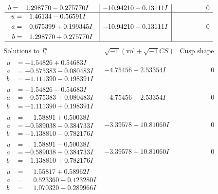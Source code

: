 \documentclass[1p]{elsarticle_modified}
\theoremstyle{definition}
\newcommand{\I}{\sqrt{-1}}
\begin{document}
$$\begin{array}{c|c|c}
\begin{aligned}
b &= \phantom{-}1.298770 - 0.275770 I\end{aligned}
 & -10.94210 + 0.13111 I & \phantom{-0.000000 } 0 \\ \hline\begin{aligned}
u &= \phantom{-}1.46134 - 0.56591 I \\
a &= \phantom{-}0.675399 + 0.199345 I \\
b &= \phantom{-}1.298770 + 0.275770 I\end{aligned}
 & -10.94210 - 0.13111 I & \phantom{-0.000000 } 0\\
 \hline 
 \end{array}$$\newpage$$\begin{array}{c|c|c}  
\text{Solutions to }I^u_{1}& \I (\text{vol} + \sqrt{-1}CS) & \text{Cusp shape}\\
 \hline 
\begin{aligned}
u &= -1.54826 + 0.54683 I \\
a &= -0.575383 - 0.080483 I \\
b &= -1.111390 - 0.198391 I\end{aligned}
 & -4.75456 - 2.53354 I & \phantom{-0.000000 } 0 \\ \hline\begin{aligned}
u &= -1.54826 - 0.54683 I \\
a &= -0.575383 + 0.080483 I \\
b &= -1.111390 + 0.198391 I\end{aligned}
 & -4.75456 + 2.53354 I & \phantom{-0.000000 } 0 \\ \hline\begin{aligned}
u &= \phantom{-}1.58891 + 0.50038 I \\
a &= -0.589038 - 0.384733 I \\
b &= -1.138810 - 0.782176 I\end{aligned}
 & -3.39578 - 10.81060 I & \phantom{-0.000000 } 0 \\ \hline\begin{aligned}
u &= \phantom{-}1.58891 - 0.50038 I \\
a &= -0.589038 + 0.384733 I \\
b &= -1.138810 + 0.782176 I\end{aligned}
 & -3.39578 + 10.81060 I & \phantom{-0.000000 } 0 \\ \hline\begin{aligned}
u &= \phantom{-}1.55817 + 0.58962 I \\
a &= \phantom{-}0.523360 - 0.123280 I \\
b &= \phantom{-}1.070320 - 0.289966 I\end{aligned}

\end{array}$$
\end{document}
